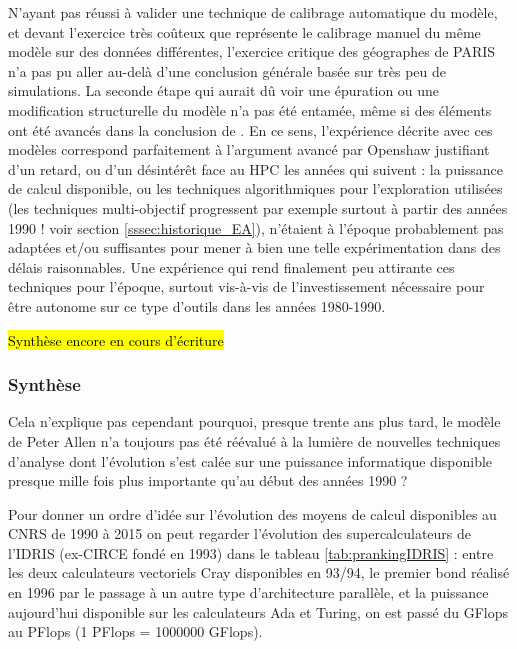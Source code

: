 N'ayant pas réussi à valider une technique de calibrage automatique du modèle, et devant l'exercice très coûteux que représente le calibrage manuel du même modèle sur des données différentes, l'exercice critique des géographes de PARIS n'a pas pu aller au-delà d'une conclusion générale basée sur très peu de simulations. La seconde étape qui aurait dû voir une épuration ou une modification structurelle du modèle n'a pas été entamée, même si des éléments ont été avancés dans la conclusion de \textcite{Sanders1984}. En ce sens, l'expérience décrite avec ces modèles correspond parfaitement à l'argument avancé par Openshaw justifiant d'un retard, ou d'un désintérêt face au HPC les années qui suivent : la puissance de calcul disponible, ou les techniques algorithmiques pour l'exploration utilisées (les techniques multi-objectif progressent par exemple surtout à partir des années 1990 ! voir section \ref{sssec:historique_EA}), n'étaient à l'époque probablement pas adaptées et/ou suffisantes pour mener à bien une telle expérimentation dans des délais raisonnables. Une expérience qui rend finalement peu attirante ces techniques pour l'époque, surtout vis-à-vis de l'investissement nécessaire pour être autonome sur ce type d'outils dans les années 1980-1990.

\hl{Synthèse encore en cours d'écriture}

\subsubsection{Synthèse}
\label{sssec:synthese}

Cela n'explique pas cependant pourquoi, presque trente ans plus tard, le modèle de Peter Allen n'a toujours pas été réévalué à la lumière de nouvelles techniques d'analyse dont l'évolution s'est calée sur une puissance informatique disponible presque mille fois plus importante qu'au début des années 1990 ?

Pour donner un ordre d'idée sur l'évolution des moyens de calcul disponibles au CNRS de 1990 à 2015 on peut regarder l'évolution des supercalculateurs de l'IDRIS (ex-CIRCE fondé en 1993) dans le tableau \ref{tab:prankingIDRIS} : entre les deux calculateurs vectoriels Cray disponibles en 93/94, le premier bond réalisé en 1996 par le passage à un autre type d'architecture parallèle, et la puissance aujourd'hui disponible sur les calculateurs Ada et Turing, on est passé du GFlops au PFlops (1 PFlops = 1000000 GFlops).

